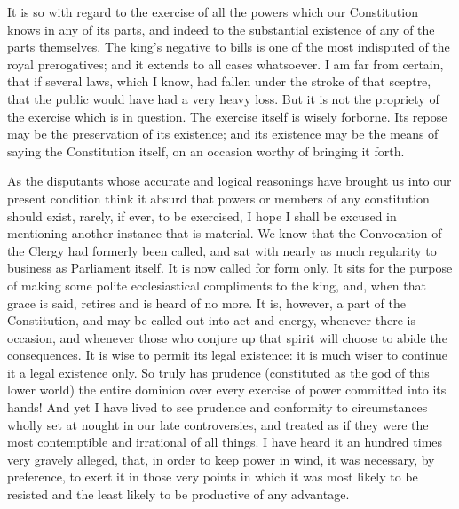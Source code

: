 It is so with regard to the exercise of all the powers which our Constitution knows in any of its parts, and indeed to the substantial existence of any of the parts themselves. The king's negative to bills is one of the most indisputed of the royal prerogatives; and it extends to all cases whatsoever. I am far from certain, that if several laws, which I know, had fallen under the stroke of that sceptre, that the public would have had a very heavy loss. But it is not the propriety of the exercise which is in question. The exercise itself is wisely forborne. Its repose may be the preservation of its existence; and its existence may be the means of saying the Constitution itself, on an occasion worthy of bringing it forth.

As the disputants whose accurate and logical reasonings have brought us into our present condition think it absurd that powers or members of any constitution should exist, rarely, if ever, to be exercised, I hope I shall be excused in mentioning another instance that is material. We know that the Convocation of the Clergy had formerly been called, and sat with nearly as much regularity to business as Parliament itself. It is now called for form only. It sits for the purpose of making some polite ecclesiastical compliments to the king, and, when that grace is said, retires and is heard of no more. It is, however, a part of the Constitution, and may be called out into act and energy, whenever there is occasion, and whenever those who conjure up that spirit will choose to abide the consequences. It is wise to permit its legal existence: it is much wiser to continue it a legal existence only. So truly has prudence (constituted as the god of this lower world) the entire dominion over every exercise of power committed into its hands! And yet I have lived to see prudence and conformity to circumstances wholly set at nought in our late controversies, and treated as if they were the most contemptible and irrational of all things. I have heard it an hundred times very gravely alleged, that, in order to keep power in wind, it was necessary, by preference, to exert it in those very points in which it was most likely to be resisted and the least likely to be productive of any advantage.

